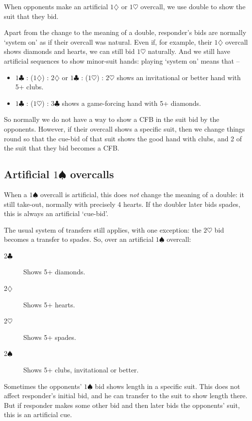 \documentclass{article}
\newcommand{\sz}{\spadesuit}
\newcommand{\hz}{\heartsuit}
\newcommand{\dz}{\diamondsuit}
\newcommand{\cz}{\clubsuit}
\begin{document}
When opponents make an artificial $1\dz$ or $1\hz$ overcall, we use double to show the suit that they bid.

Apart from the change to the meaning of a double, responder's bids are normally `system on' as if their overcall was natural. Even if, for example, their $1\dz$ overcall shows diamonds and hearts, we can still bid $1\hz$ naturally. And we still have artificial sequences to show minor-suit hands: playing `system on' means that --
\begin{itemize}
\item $1\cz$ : ($1\dz$) : $2\dz$ or $1\cz$ : ($1\hz$) : $2\hz$ shows an invitational or better hand with 5+ clubs.
\item $1\cz$ : ($1\hz$) : $3\cz$ shows a game-forcing hand with 5+ diamonds.
\end{itemize}
So normally we do not have a way to show a CFB in the suit bid by the opponents. However, if their overcall shows a specific suit, then we change things round so that the cue-bid of that suit shows the good hand with clubs, and 2 of the suit that they bid becomes a CFB.

\subsection{Artificial $1\sz$ overcalls}

When a $1\sz$ overcall is artificial, this does \emph{not} change the meaning of a double: it still take-out, normally with precisely 4 hearts. If the doubler later bids spades, this is always an artificial `cue-bid'.

The usual system of transfers still applies, with one exception: the $2\hz$ bid becomes a transfer to spades. So, over an artificial $1\sz$ overcall:
\begin{description}
\item[2$\cz$] Shows 5+ diamonds.
\item[2$\dz$] Shows 5+ hearts.
\item[2$\hz$] Shows 5+ spades.
\item[2$\sz$] Shows 5+ clubs, invitational or better.
\end{description}

Sometimes the opponents' $1\sz$ bid shows length in a specific suit. This does not affect responder's initial bid, and he can transfer to the suit to show length there. But if responder makes some other bid and then later bids the opponents' suit, this is an artificial cue.
\end{document}
